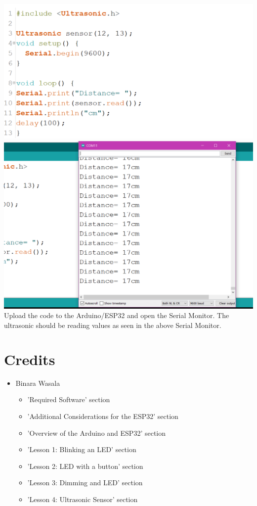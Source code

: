 \documentclass[a4paper,12pt]{report}
\newcommand{\diagramWidth}{150mm}
\begin{document}
    \newpage
    \includegraphics[width = \diagramWidth]{Assets/ultrasonic_code.png} \\
    \includegraphics[width = \diagramWidth]{Assets/ultrasonic_monitor.png} \\
    Upload the code to the Arduino/ESP32 and open the Serial Monitor. The ultrasonic should be reading values as seen in the above Serial Monitor.
\newpage
\section*{Credits}
\begin{itemize}
    \item Binara Wasala
    \begin{itemize}
        \item 'Required Software' section
        \item 'Additional Considerations for the ESP32' section
        \item 'Overview of the Arduino and ESP32' section
        \item 'Lesson 1: Blinking an LED' section
        \item 'Lesson 2: LED with a button' section
        \item 'Lesson 3: Dimming and LED' section
        \item 'Lesson 4: Ultrasonic Sensor' section
    \end{itemize}
\end{itemize}
\end{document}
